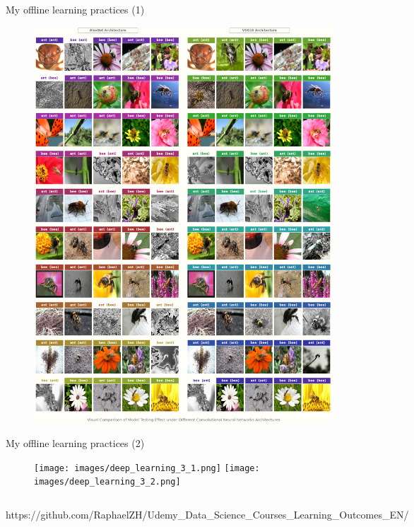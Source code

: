 \documentclass{beamer}
\begin{document}
\begin{frame}[fragile]{My offline learning practices (1)}
\begin{figure}[!htb]
			\centering\includegraphics[width=\linewidth]{images/deep_learning_2.png}
			\endminipage\hfill
			\endminipage
		\end{figure}
	\end{frame}
	
	\begin{frame}[fragile]{My offline learning practices (2)}
		\begin{figure}[!htb]
			\centering\texttt{[image: images/deep\_learning\_3\_1.png]}
			\endminipage\hfill
			\centering\texttt{[image: images/deep\_learning\_3\_2.png]}
			\endminipage
		\end{figure}
		\vspace{-.4em}
		\begin{columns}
			\normalfont\footnotesize{https://github.com/RaphaelZH/Udemy\_Data\_Science\_Courses\_Learning\_Outcomes\_EN/}
		\end{columns}
	\end{frame}
	
\end{document}
